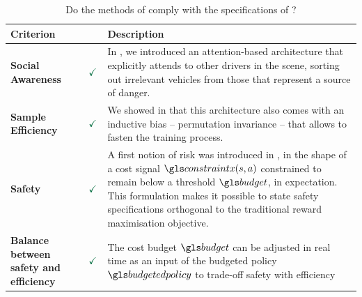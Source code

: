 \begin{table}[H]
	\begin{tabularx}{\linewidth}{p{4.3cm}cX}
		\toprule
		Criterion & & Description \\
		\midrule
		\textbf{Social Awareness} & {\Large $\hlgb{\checkmark}$} & In \Cref{chapter:4}, we introduced an attention-based \glsxtrlong{NN} architecture that explicitly attends to other drivers in the scene, sorting out irrelevant vehicles from those that represent a source of danger. \\
		\textbf{Sample Efficiency} & {\Large $\hlgb{\checkmark}$} & We showed in \Cref{fig:attention-reward} that this architecture also comes with an inductive bias -- permutation invariance -- that allows to fasten the training process. \\
		\textbf{Safety} & {\Large $\hlgb{\checkmark}$} & A first notion of risk was introduced in \Cref{chapter:5}, in the shape of a cost signal $\constraint(s,a)$ constrained to remain below a threshold $\budget$, in expectation. This formulation makes it possible to state safety specifications orthogonal to the traditional reward maximisation objective.\\
		\textbf{Balance between safety and efficiency} & {\Large $\hlgb{\checkmark}$} & The cost budget $\budget$ can be adjusted in real time as an input of the budgeted policy $\budgetedpolicy$ to trade-off safety with  efficiency \\
		\bottomrule
	\end{tabularx}
	\caption{Do the methods of  comply with the specifications of ?}
	\label{tab:part-2-conclusion}
\end{table}
